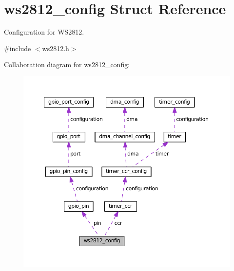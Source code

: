 \hypertarget{structws2812__config}{}\section{ws2812\+\_\+config Struct Reference}
\label{structws2812__config}


Configuration for W\+S2812.  




{\ttfamily \#include $<$ws2812.\+h$>$}



Collaboration diagram for ws2812\+\_\+config\+:
\nopagebreak
\begin{figure}[H]
\begin{center}
\leavevmode
\includegraphics[width=350pt]{structws2812__config__coll__graph}
\end{center}
\end{figure}
